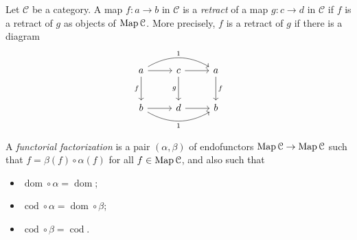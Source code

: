 \begin{definition}\label{1.1.1}
	Let $\mathcal{C} $ be a category. A map $f : a \to b$ in $\mathcal{C} $ is a \emph{retract} of a map $g : c \to d$ in $\mathcal{C} $ if $f$ is a retract of $g$ as objects of $\operatorname{Map} \mathcal{C} $. More precisely, $f$ is a retract of $g$ if there is a diagram
	\[\begin{tikzcd}[row sep = 2.5em, column sep = 2.5em]
	a\ar[" f "', d] \ar[" 1 ", bend left, rr] \ar[r]  & c\ar[" g "', d] \ar[r]  & a\ar[" f ", d]  \\
	b \ar[" 1 "', bend right, rr] \ar[r]  & d \ar[r]  & b
	\end{tikzcd}\]
	
	A \emph{functorial factorization} is a pair $(\alpha,\beta)$ of endofunctors $\operatorname{Map} \mathcal{C} \to \operatorname{Map} \mathcal{C} $ such that $f=\beta(f)\circ \alpha(f)$ for all $f\in \operatorname{Map} \mathcal{C} $, and also such that
	\begin{itemize}
		\item $\operatorname{dom} \circ \alpha = \operatorname{dom} $;
		\item $\operatorname{cod} \circ \alpha = \operatorname{dom} \circ \beta$;
		\item $\operatorname{cod} \circ \beta=\operatorname{cod} $.
	\end{itemize}
\end{definition}

